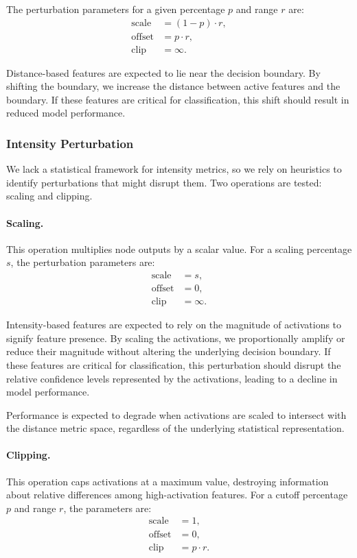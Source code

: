 The perturbation parameters for a given percentage $p$ and range $r$ are:
\begin{align}
    \text{scale} &= (1 - p) \cdot r, \\
    \text{offset} &= p \cdot r, \\
    \text{clip} &= \infty.
\end{align}

Distance-based features are expected to lie near the decision boundary. By shifting the boundary, we increase the distance between active features and the boundary. If these features are critical for classification, this shift should result in reduced model performance.

\subsubsection{Intensity Perturbation}

We lack a statistical framework for intensity metrics, so we rely on heuristics to identify perturbations that might disrupt them. Two operations are tested: scaling and clipping.

\paragraph{Scaling.} This operation multiplies node outputs by a scalar value. For a scaling percentage $s$, the perturbation parameters are:
\begin{align}
    \text{scale} &= s, \\
    \text{offset} &= 0, \\
    \text{clip} &= \infty.
\end{align}

Intensity-based features are expected to rely on the magnitude of activations to signify feature presence. By scaling the activations, we proportionally amplify or reduce their magnitude without altering the underlying decision boundary. If these features are critical for classification, this perturbation should disrupt the relative confidence levels represented by the activations, leading to a decline in model performance.

Performance is expected to degrade when activations are scaled to intersect with the distance metric space, regardless of the underlying statistical representation.


\paragraph{Clipping.} This operation caps activations at a maximum value, destroying information about relative differences among high-activation features. For a cutoff percentage $p$ and range $r$, the parameters are:
\begin{align}
    \text{scale} &= 1, \\
    \text{offset} &= 0, \\
    \text{clip} &= p \cdot r.
\end{align}

